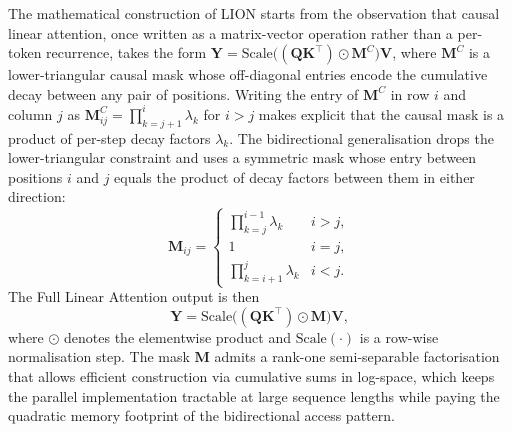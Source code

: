 The mathematical construction of LION starts from the observation
that causal linear attention, once written as a matrix-vector
operation rather than a per-token recurrence, takes the form
$\mathbf{Y} = \mathrm{Scale}\!\big((\mathbf{Q} \mathbf{K}^{\top}) \odot \mathbf{M}^{C}\big) \mathbf{V}$,
where $\mathbf{M}^{C}$ is a lower-triangular causal mask whose
off-diagonal entries encode the cumulative decay between any pair of
positions. Writing the entry of $\mathbf{M}^{C}$ in row $i$ and column
$j$ as $\mathbf{M}^{C}_{ij} = \prod_{k = j+1}^{i} \lambda_{k}$ for
$i > j$ makes explicit that the causal mask is a product of per-step
decay factors $\lambda_{k}$. The bidirectional generalisation drops
the lower-triangular constraint and uses a symmetric mask whose
entry between positions $i$ and $j$ equals the product of decay
factors between them in either direction:
\begin{equation}\label{eq:lion-mask}
\mathbf{M}_{ij} = \begin{cases}
\prod_{k = j}^{i - 1} \lambda_{k} & i > j, \\
1 & i = j, \\
\prod_{k = i + 1}^{j} \lambda_{k} & i < j.
\end{cases}
\end{equation}
The Full Linear Attention output is then
\begin{equation}\label{eq:lion-fullatt}
\mathbf{Y} = \mathrm{Scale}\!\big((\mathbf{Q} \mathbf{K}^{\top}) \odot \mathbf{M}\big) \mathbf{V},
\end{equation}
where $\odot$ denotes the elementwise product and $\mathrm{Scale}(\cdot)$
is a row-wise normalisation step. The mask $\mathbf{M}$ admits a
rank-one semi-separable factorisation~\cite{afzal2025linear} that
allows efficient construction via cumulative sums in log-space, which
keeps the parallel implementation tractable at large sequence lengths
while paying the quadratic memory footprint of the bidirectional
access pattern.

